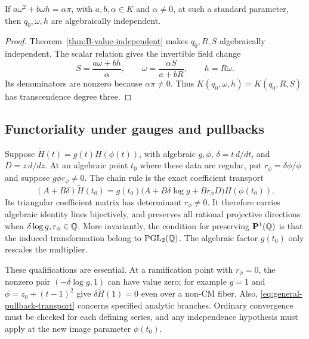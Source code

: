 \begin{proposition}\label{prop:B-period-field}
If $a\omega^2+b\omega h=\alpha\pi$, with
$a,b,\alpha\in K$ and $\alpha\ne0$, at such a standard parameter,
then $q_0,\omega,h$ are algebraically independent.
\end{proposition}
\begin{proof}
Theorem~\ref{thm:B-value-independent} makes $q_0,R,S$
algebraically independent. The scalar relation gives the invertible
field change
\[
 S=\frac{a\omega+bh}{\alpha},\qquad
 \omega=\frac{\alpha S}{a+bR},\qquad h=R\omega.
\]
Its denominators are nonzero because $\alpha\pi\ne0$.
Thus $K(q_0,\omega,h)=K(q_0,R,S)$ has transcendence degree three.
\end{proof}

\subsection{Functoriality under gauges and pullbacks}
Suppose $\widetilde H(t)=g(t)H(\phi(t))$, with algebraic $g,\phi$,
$\delta=t\,d/dt$, and $D=z\,d/dz$. At an algebraic point $t_0$
where these data are regular, put
$r_\phi=\delta\phi/\phi$ and suppose $g\phi r_\phi\ne0$.
The chain rule is the exact coefficient transport
\begin{equation}\label{eq:general-pullback-transport}
 (A+B\delta)\widetilde H(t_0)
 =g(t_0)\bigl(A+B\delta\log g+B r_\phi D\bigr)H(\phi(t_0)).
\end{equation}
Its triangular coefficient matrix has determinant $r_\phi\ne0$.
It therefore carries algebraic identity lines bijectively, and
preserves all rational projective directions when
$\delta\log g,r_\phi\in\mathbb Q$. More invariantly, the condition for
preserving $\mathbf P^1(\mathbb Q)$ is that the induced transformation
belong to $\mathrm{PGL}_2(\mathbb Q)$. The algebraic factor $g(t_0)$ only
rescales the multiplier.

These qualifications are essential. At a ramification point with
$r_\phi=0$, the nonzero pair $(-\delta\log g,1)$ can have value
zero; for example $g=1$ and $\phi=z_0+(t-1)^2$ give
$\delta\widetilde H(1)=0$ even over a non-CM fiber. Also,
\eqref{eq:general-pullback-transport} concerns specified analytic
branches. Ordinary convergence must be checked for each defining
series, and any independence hypothesis must apply at the new
image parameter $\phi(t_0)$.

